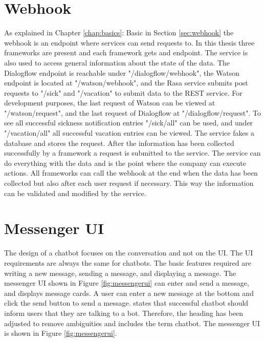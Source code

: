 \section{Webhook}
As explained in Chapter \ref{chap:basics}: Basic in Section \ref{sec:webhook} 
the webhook is an endpoint where services can send requests to.
In this thesis three frameworks are present and each framework gets and endpoint.
The service is also used to access general information about the state of the data.
The Dialogflow endpoint is reachable under "/dialogflow/webhook",
the Watson endpoint is located at "/watson/webhook",
and the Rasa service submits post requests to "/sick" and "/vacation" to submit data 
to the REST service.
For development purposes, the last request of Watson can be viewed at "/watson/request",
and the last request of Dialogflow at "/dialogflow/request".
To see all successful sickness notification entries "/sick/all" can be used,
and under "/vacation/all" all successful vacation entries can be viewed.
The service fakes a database and stores the request.
After the information has been collected successfully by a framework a 
request is submitted to the service.
The service can do everything with the data and is the point where the company can execute actions.
All frameworks can call the webhook at the end when the data has been collected but also 
after each user request if necessary.
This way the information can be validated and modified by the service.

\section{Messenger UI}
The design of a chatbot focuses on the conversation and not on the UI.
The UI requirements are always the same for chatbots.
The basic features required are writing a new message, sending a message, and displaying a message.
The messenger UI shown in Figure \ref{fig:messengerui} can enter and send 
a message, and displays message cards.
A user can enter a new message at the bottom and click the send button to send a message.
\citet{brandtzaeg2018chatbots} states that successful chatbot should inform users that they are talking to a bot.
Therefore, the heading has been adjusted to remove ambiguities and includes the term chatbot.
The messenger UI is shown in Figure \ref{fig:messengerui}. 
